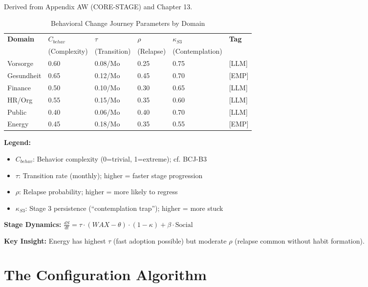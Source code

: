 Derived from Appendix AW (CORE-STAGE) and Chapter 13.

\begin{table}[htbp]
\centering
\caption{Behavioral Change Journey Parameters by Domain}
\label{tab:ggg-stage-mapping}
\renewcommand{\arraystretch}{1.3}
\begin{tabular}{@{}llllll@{}}
\toprule
\textbf{Domain} & \textbf{$C_{behav}$} & \textbf{$\tau$} & \textbf{$\rho$} & \textbf{$\kappa_{S3}$} & \textbf{Tag} \\
 & (Complexity) & (Transition) & (Relapse) & (Contemplation) & \\
\midrule
Vorsorge & 0.60 & 0.08/Mo & 0.25 & 0.75 & [LLM] \\
Gesundheit & 0.65 & 0.12/Mo & 0.45 & 0.70 & [EMP] \\
Finance & 0.50 & 0.10/Mo & 0.30 & 0.65 & [LLM] \\
HR/Org & 0.55 & 0.15/Mo & 0.35 & 0.60 & [LLM] \\
Public & 0.40 & 0.06/Mo & 0.40 & 0.70 & [LLM] \\
Energy & 0.45 & 0.18/Mo & 0.35 & 0.55 & [EMP] \\
\bottomrule
\end{tabular}
\end{table}

\textbf{Legend:}
\begin{itemize}[nosep]
\item $C_{behav}$: Behavior complexity (0=trivial, 1=extreme); cf. BCJ-B3
\item $\tau$: Transition rate (monthly); higher = faster stage progression
\item $\rho$: Relapse probability; higher = more likely to regress
\item $\kappa_{S3}$: Stage 3 persistence (``contemplation trap''); higher = more stuck
\end{itemize}

\textbf{Stage Dynamics:} $\frac{dS}{dt} = \tau \cdot (WAX - \theta) \cdot (1-\kappa) + \beta \cdot \text{Social}$

\textbf{Key Insight:} Energy has highest $\tau$ (fast adoption possible) but moderate $\rho$ (relapse common without habit formation).


\section{The Configuration Algorithm}
\label{sec:ggg-algorithm}

